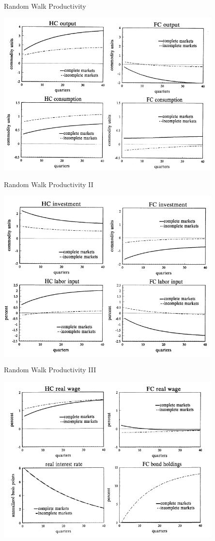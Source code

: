 \documentclass[10pt]{beamer}
\begin{document}
\begin{frame}{Random Walk Productivity}
\centerline{\includegraphics[width=0.85\textwidth]{f1.png}}
\end{frame}
\begin{frame}{Random Walk Productivity II}
\centerline{\includegraphics[width=0.85\textwidth]{f2.png}}
\end{frame}

\begin{frame}{Random Walk Productivity III}
\centerline{\includegraphics[width=0.85\textwidth]{f3.png}}
\end{frame}
\end{document}
